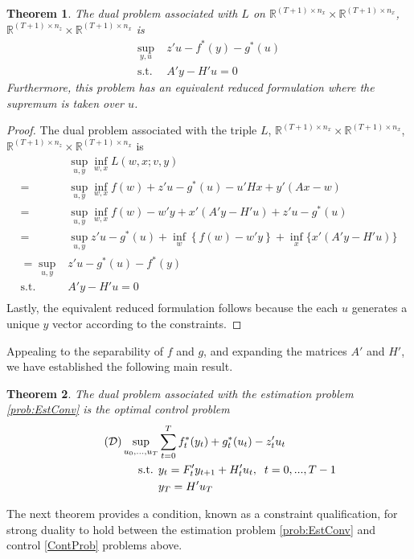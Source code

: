 \documentclass[12pt]{article}
\newcommand{\R}{{\mathbb R}}
\newtheorem{theorem}{Theorem}[section]
\theoremstyle{remark}
\theoremstyle{remark}
\begin{document}
\begin{theorem} \label{SupervectorDual}
The dual problem associated with $L$ on $\R^{(T+1) \times n_{x}} \times
\R^{(T+1) \times n_{x}}$, $\R^{(T+1) \times n_{z}} \times \R^{(T+1) \times n_{x}}$ is
\begin{align}\label{ContProb}
\sup_{y, u} \;& z'u-f^{*}(y) - g^{*}(u) \\
\text{s.t. } & A'y - H'u = 0 \nonumber
\end{align}
Furthermore, this problem has an equivalent reduced formulation where
the supremum is taken over $u$.
\end{theorem}
\begin{proof}
The dual
problem associated with the triple $L$, $\R^{(T+1) \times n_{x}} \times
\R^{(T+1) \times n_{x}}$, $\R^{(T+1) \times n_{z}} \times \R^{(T+1)
\times n_{x}}$ is
\begin{align*}
&\sup_{u, y} \inf_{w,x} L(w,x;v,y) \\
= &\sup_{u,y} \inf_{w,x} f(w) + z'u - g^{*}(u) - u'Hx + y'(Ax-w) \\
= & \sup_{u,y} \inf_{w,x} f(w) -w'y + x'(A'y-H'u) + z'u - g^{*}(u) \\
= & \sup_{u,y} z'u - g^{*}(u) + \inf_{w} \left\{ f(w) - w'y \right\} +
\inf_{x} \{ x'(A'y-H'u) \}\\
= \sup_{u,y} & z'u - g^{*}(u) -f^{*}(y) \\
\text{s.t. } & A'y-H'u=0 \\
\end{align*}
Lastly, the equivalent reduced formulation follows because the each
$u$ generates a unique $y$ vector according to the constraints.
\end{proof}
Appealing to the separability of $f$ and $g$, and expanding the
matrices $A'$ and $H'$, we have established the following main result.
\begin{theorem} \label{MainTheorem}
The dual problem associated with the estimation problem
\eqref{prob:EstConv} is the optimal control problem
\begin{align}\label{DualConvProbExp} \tag{$\mathcal{D}$}
\sup_{u_{0},...,u_{T}} & \sum_{t=0}^{T} f_{t}^{*}(y_{t}) + g_{t}^{*}(u_{t}) -
z_{t}' u_{t} \\
\text{s.t. } & y_{t} = F_{t}' y_{t+1} + H'_{t} u_{t}, \; \;
t=0,...,T-1 \nonumber \\
& y_{T} = H' u_{T} \nonumber 
\end{align}
\end{theorem}

The next theorem provides a condition, known as a constraint
qualification, for strong duality to hold between the estimation
problem \ref{prob:EstConv} and control \ref{ContProb} problems above.
\end{document}
